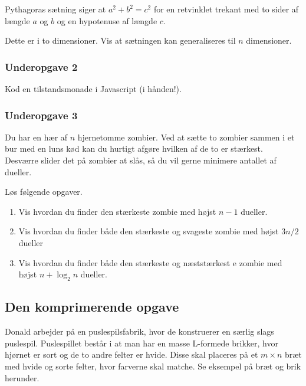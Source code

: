 Pythagoras sætning siger at $a^2 + b^2 = c^2$ for en retvinklet trekant med to
sider af længde $a$ og $b$ og en hypotenuse af længde $c$.

Dette er i to dimensioner.  Vis at sætningen kan generaliseres til $n$
dimensioner.


\subsubsection{Underopgave 2}

Kod en tilstandsmonade i Javascript (i hånden!).


\subsubsection{Underopgave 3}

Du har en hær af $n$ hjernetomme zombier. Ved at sætte to zombier sammen i et
bur med en luns kød kan du hurtigt afgøre hvilken af de to er stærkest.\\
Desværre slider det på zombier at slås, så du vil gerne minimere antallet af
dueller.

Løs følgende opgaver.
\begin{enumerate}
  \item Vis hvordan du finder den stærkeste zombie med højst $n−1$ dueller.
  \item Vis hvordan du finder både den stærkeste og svageste zombie med højst
    $3 n/2$ dueller
  \item Vis hvordan du finder både  den stærkeste og næststærkest e zombie med
    højst  $n+\log_2 n$ dueller.
\end{enumerate}
\newpage

\subsection{Den komprimerende opgave}

Donald arbejder på en puslespilsfabrik, hvor de konstruerer en særlig slags
puslespil. Puslespillet består i at man har en masse L-formede brikker, hvor
hjørnet er sort og de to andre felter er hvide. Disse skal placeres på et
$m\times n$ bræt med hvide og sorte felter, hvor farverne skal matche. Se
eksempel på bræt og brik herunder.

